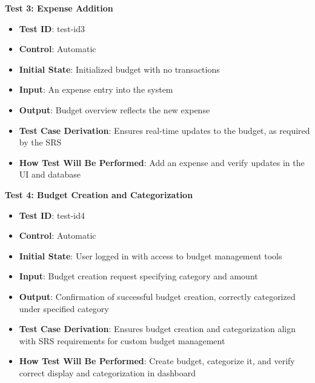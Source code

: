 \documentclass[12pt, titlepage]{article}
\begin{document}
\textbf{Test 3: Expense Addition}
\begin{itemize}
    \item \textbf{Test ID}: test-id3
    \item \textbf{Control}: Automatic
    \item \textbf{Initial State}: Initialized budget with no transactions
    \item \textbf{Input}: An expense entry into the system
    \item \textbf{Output}: Budget overview reflects the new expense
    \item \textbf{Test Case Derivation}: Ensures real-time updates to the budget, as required by the SRS
    \item \textbf{How Test Will Be Performed}: Add an expense and verify updates in the UI and database
\end{itemize}
\textbf{Test 4: Budget Creation and Categorization}
\begin{itemize}
    \item \textbf{Test ID}: test-id4
    \item \textbf{Control}: Automatic
    \item \textbf{Initial State}: User logged in with access to budget management tools
    \item \textbf{Input}: Budget creation request specifying category and amount
    \item \textbf{Output}: Confirmation of successful budget creation, correctly categorized under specified category
    \item \textbf{Test Case Derivation}: Ensures budget creation and categorization align with SRS requirements for custom budget management
    \item \textbf{How Test Will Be Performed}: Create budget, categorize it, and verify correct display and categorization in dashboard
\end{itemize}
\end{document}
